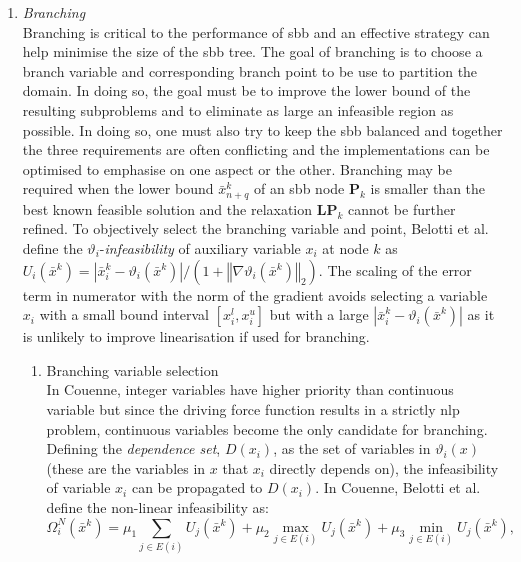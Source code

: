 \begin{enumerate}
	\item \emph{Branching}\\
		Branching is critical to the performance of \gls{sbb} and an effective strategy can help minimise the size of the \gls{sbb} tree. The goal of branching is to choose a branch variable and corresponding branch point to be use to partition the domain. In doing so, the goal must be to improve the lower bound of the resulting subproblems and to eliminate as large an infeasible region as possible. In doing so, one must also try to keep the \gls{sbb} balanced and together the three requirements are often conflicting and the implementations can be optimised to emphasise on one aspect or the other. Branching may be required when the lower bound $\bar{x}_{n+q}^k$ of an \gls{sbb} node $\mathbf{P}_k$ is smaller than the best known feasible solution and the relaxation $\mathbf{LP}_k$ cannot be further refined. To objectively select the branching variable and point, Belotti et al. \cite{Belotti:2009aa} define the $\vartheta_i$-\textit{infeasibility} of auxiliary variable $x_i$ at node $k$ as $U_i\left(\bar{x}^k\right) = \left|\bar{x}_i^k - \vartheta_i\left(\bar{x}^k\right) \right| \slash \left(1 + \left \Vert \nabla \vartheta_i(\bar{x}^k)  \right \Vert_2\right)$. The scaling of the error term in numerator with the norm of the gradient avoids selecting a variable $x_i$ with a small bound interval $[x_i^l, x_i^u]$ but with a large $\left|\bar{x}_i^k - \vartheta_i\left(\bar{x}^k\right) \right|$ as it is unlikely to improve linearisation if used for branching.
		\begin{enumerate}
			\item	Branching variable selection\\
				In Couenne, integer variables have higher priority than continuous variable but since the driving force function results in a strictly \gls{nlp} problem, continuous variables become the only candidate for branching. Defining the \emph{dependence set}, $D(x_i)$, as the set of variables in $\vartheta_i(x)$ (these are the variables in $x$ that $x_i$ directly depends on), the infeasibility of variable $x_i$ can be propagated to $D(x_i)$. In Couenne, Belotti et al. \cite{Belotti:2009aa} define the non-linear infeasibility as:
				\[
					\Omega_i^N(\bar{x}^k) = \mu_1 \sum_{j\in E(i)} U_j(\bar{x}^k) +  \mu_2 \max_{j\in E(i)} U_j(\bar{x}^k) +  \mu_3 \min_{j\in E(i)} U_j(\bar{x}^k),
				\]

\end{enumerate}
\end{enumerate}
